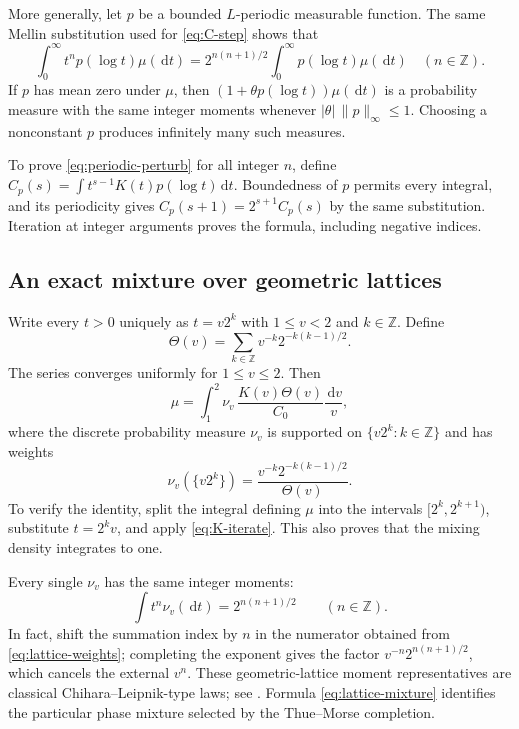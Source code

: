 \documentclass[11pt,a4paper]{article}
\numberwithin{equation}{section}
\theoremstyle{definition}
\theoremstyle{remark}
\newcommand{\Z}{\mathbb Z}
\newcommand{\dd}{\,\mathrm d}
\newcommand{\abs}[1]{\left|#1\right|}
\begin{document}
More generally, let $p$ be a bounded $L$-periodic measurable function.
The same Mellin substitution used for \cref{eq:C-step} shows that
\begin{equation}
 \int_0^\infty t^n p(\log t)\mu(\dd t)
 =2^{n(n+1)/2}\int_0^\infty p(\log t)\mu(\dd t)
 \quad(n\in\Z).
 \label{eq:periodic-perturb}
\end{equation}
If $p$ has mean zero under $\mu$, then
$(1+\theta p(\log t))\mu(\dd t)$ is a probability measure with the
same integer moments whenever $\abs\theta\,\|p\|_\infty\le1$.
Choosing a nonconstant $p$ produces infinitely many such measures.

To prove \cref{eq:periodic-perturb} for all integer $n$, define
$C_p(s)=\int t^{s-1}K(t)p(\log t)\dd t$. Boundedness of $p$
permits every integral, and its periodicity gives
$C_p(s+1)=2^{s+1}C_p(s)$ by the same substitution. Iteration at
integer arguments proves the formula, including negative indices.

\subsection{An exact mixture over geometric lattices}
Write every $t>0$ uniquely as $t=v2^k$ with $1\le v<2$ and
$k\in\Z$. Define
\begin{equation}
 \Theta(v)=\sum_{k\in\Z}v^{-k}2^{-k(k-1)/2}.
 \label{eq:Theta}
\end{equation}
The series converges uniformly for $1\le v\le2$. Then
\begin{equation}
 \mu=\int_1^2 \nu_v\,
        \frac{K(v)\Theta(v)}{C_0}\frac{\dd v}{v},
 \label{eq:lattice-mixture}
\end{equation}
where the discrete probability measure $\nu_v$ is supported on
$\{v2^k:k\in\Z\}$ and has weights
\begin{equation}
 \nu_v(\{v2^k\})=
 \frac{v^{-k}2^{-k(k-1)/2}}{\Theta(v)}.
 \label{eq:lattice-weights}
\end{equation}
To verify the identity, split the integral defining $\mu$ into the
intervals $[2^k,2^{k+1})$, substitute $t=2^kv$, and apply
\cref{eq:K-iterate}. This also proves that the mixing density
integrates to one.

Every single $\nu_v$ has the same integer moments:
\begin{equation}
 \int t^n\nu_v(\dd t)=2^{n(n+1)/2}
 \qquad(n\in\Z).
 \label{eq:lattice-moments}
\end{equation}
In fact, shift the summation index by $n$ in the numerator obtained
from \cref{eq:lattice-weights}; completing the exponent gives the
factor $v^{-n}2^{n(n+1)/2}$, which cancels the external $v^n$.
These geometric-lattice moment representatives are classical
Chihara--Leipnik-type laws; see \cite{AGK}. Formula
\cref{eq:lattice-mixture} identifies the particular phase mixture
selected by the Thue--Morse completion.
\end{document}
